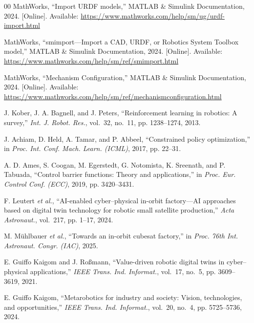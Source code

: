 \documentclass{ieeeaccess}
\begin{document}
\begin{thebibliography}{00}
 MathWorks, ``Import URDF models,'' MATLAB \& Simulink Documentation, 2024. [Online].
Available: \url{https://www.mathworks.com/help/sm/ug/urdf-import.html}



MathWorks, ``smimport---Import a CAD, URDF, or Robotics System Toolbox model,'' MATLAB \& Simulink Documentation,
2024. [Online]. Available: \url{https://www.mathworks.com/help/sm/ref/smimport.html}



 MathWorks, ``Mechanism Configuration,'' MATLAB \& Simulink Documentation, 2024. [Online].
Available: \url{https://www.mathworks.com/help/sm/ref/mechanismconfiguration.html}



J. Kober, J. A. Bagnell, and J. Peters, ``Reinforcement learning in robotics: A survey,''
\emph{Int. J. Robot. Res.}, vol.~32, no.~11, pp. 1238--1274, 2013.



 J. Achiam, D. Held, A. Tamar, and P. Abbeel, ``Constrained policy optimization,'' in
\emph{Proc. Int. Conf. Mach. Learn. (ICML)}, 2017, pp. 22--31.



A. D. Ames, S. Coogan, M. Egerstedt, G. Notomista, K. Sreenath, and P. Tabuada,
``Control barrier functions: Theory and applications,'' in \emph{Proc. Eur. Control Conf. (ECC)}, 2019, pp.
3420--3431.



F. Leutert \emph{et al.}, ``AI-enabled cyber--physical in-orbit factory---AI approaches based on digital twin technology
for robotic small satellite production,'' \emph{Acta Astronaut.}, vol.~217, pp. 1--17, 2024.



 M. M{\"u}hlbauer \emph{et al.}, ``Towards an in-orbit cubesat factory,''
in \emph{Proc. 76th Int. Astronaut. Congr. (IAC)}, 2025.

E. Guiffo Kaigom and J. Roßmann, ``Value-driven robotic digital twins in cyber--physical
applications,'' \emph{IEEE Trans. Ind. Informat.}, vol.~17, no.~5, pp. 3609--3619, 2021.

E. Guiffo Kaigom, ``Metarobotics for industry and society: Vision, technologies, and
opportunities,'' \emph{IEEE Trans. Ind. Informat.}, vol.~20, no.~4, pp. 5725--5736, 2024.




\end{thebibliography}
\end{document}
